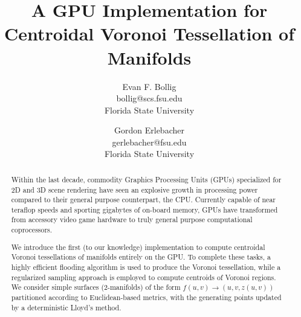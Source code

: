 \documentclass[a4paper,10pt]{article}
\title{A GPU Implementation for Centroidal Voronoi Tessellation of Manifolds}
\author{Evan F. Bollig \\ bollig@scs.fsu.edu \\ Florida State University   \and Gordon Erlebacher \\ gerlebacher@fsu.edu \\ Florida State University}
\begin{document}
\maketitle

\begin{abstract}

Within the last decade, commodity Graphics Processing Units (GPUs) specialized for 2D and 3D scene rendering have seen an explosive growth in processing power compared to their general purpose counterpart, the CPU. Currently capable of near teraflop speeds and sporting gigabytes of on-board memory, GPUs have transformed from accessory video game hardware to truly general purpose computational coprocessors. 

We introduce the first (to our knowledge) implementation to compute centroidal Voronoi tessellations of manifolds entirely on the GPU. To complete these tasks, a highly efficient flooding algorithm is used to produce the Voronoi tessellation, while a regularized sampling approach is employed to compute centroids of Voronoi regions. We consider simple surfaces (2-manifolds) of the form $f (u, v) \rightarrow (u, v, z (u, v))$ partitioned according to Euclidean-based metrics, with the generating points updated by a deterministic Lloyd's method. 
\end{abstract}
\end{document}
